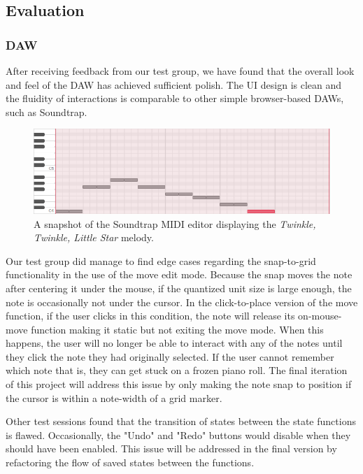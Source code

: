 \subsection{Evaluation}

\subsubsection{DAW}

After receiving feedback from our test group, we have found that the overall look and feel of the
DAW has achieved sufficient polish. The UI design is clean and the fluidity of interactions is
comparable to other simple browser-based DAWs, such as Soundtrap.

\begin{figure}[h!]
  \centering
  \includegraphics[width=\linewidth]{image/Soundtrap.png}
  \caption{A snapshot of the Soundtrap MIDI editor displaying the \textit{Twinkle, Twinkle, Little Star} melody.}
  \label{fig:soundtrap}
\end{figure}

Our test group did manage to find edge cases regarding the snap-to-grid functionality in the use
of the move edit mode. Because the snap moves the note after centering it under the mouse, if the
quantized unit size is large enough, the note is occasionally not under the cursor. In the
click-to-place version of the move function, if the user clicks in this condition, the note will
release its on-mouse-move function making it static but not exiting the move mode. When this
happens, the user will no longer be able to interact with any of the notes until they click the
note they had originally selected. If the user cannot remember which note that is, they can get
stuck on a frozen piano roll. The final iteration of this project will address this issue by only
making the note snap to position if the cursor is within a note-width of a grid marker.

Other test sessions found that the transition of states between the state functions is flawed.
Occasionally, the "Undo" and "Redo" buttons would disable when they should have been enabled. This
issue will be addressed in the final version by refactoring the flow of saved states between the
functions.

